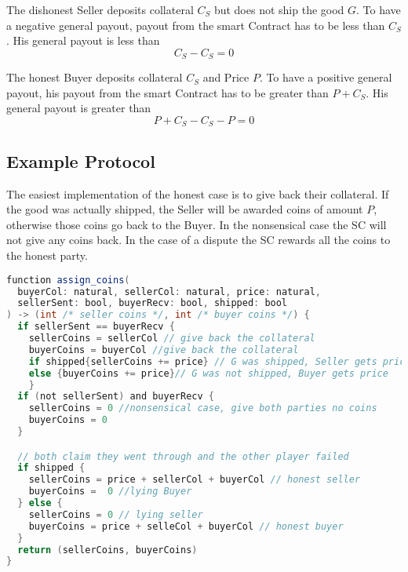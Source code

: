 \documentclass{cacthesis}
\begin{document}
The dishonest Seller deposits collateral $C_S$ but does not ship the good $G$. To have a negative general payout, payout from the smart Contract has to be less than $C_S$. His general payout is less than
\[C_S - C_S = 0\]

The honest Buyer deposits collateral $C_S$ and Price $P$. To have a positive general payout, his payout from the smart Contract has to be greater than $P + C_S$. His general payout is greater than
\[P + C_S - C_S - P = 0\]

\subsection{Example Protocol}
The easiest implementation of the honest case is to give back their collateral. If the good was actually shipped, the Seller will be awarded coins of amount $P$, otherwise those coins go back to the Buyer.\newline
In the nonsensical case the SC will not give any coins back.\newline
In the case of a dispute the SC rewards all the coins to the honest party.

\begin{lstlisting}[language=java]
function assign_coins(
  buyerCol: natural, sellerCol: natural, price: natural,
  sellerSent: bool, buyerRecv: bool, shipped: bool
) -> (int /* seller coins */, int /* buyer coins */) {
  if sellerSent == buyerRecv { 
    sellerCoins = sellerCol // give back the collateral
    buyerCoins = buyerCol //give back the collateral
    if shipped{sellerCoins += price} // G was shipped, Seller gets price
    else {buyerCoins += price}// G was not shipped, Buyer gets price
    }
  if (not sellerSent) and buyerRecv { 
    sellerCoins = 0 //nonsensical case, give both parties no coins
    buyerCoins = 0
  }

  // both claim they went through and the other player failed
  if shipped {
    sellerCoins = price + sellerCol + buyerCol // honest seller
    buyerCoins =  0 //lying Buyer
  } else {
    sellerCoins = 0 // lying seller
    buyerCoins = price + selleCol + buyerCol // honest buyer
  }
  return (sellerCoins, buyerCoins)
}
\end{lstlisting}
\end{document}
